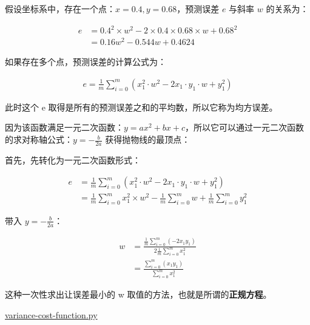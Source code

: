 \documentclass{ctexart}
\begin{document}
假设坐标系中，存在一个点：$x = 0.4, y = 0.68$，预测误差 $e$ 与斜率 $w$ 的关系为：

\[
	\begin{aligned}
		e & = 0.4^2 \times w^2 - 2 \times 0.4 \times 0.68 \times w + 0.68^2 \\
		  & = 0.16w^2 - 0.544w + 0.4624
	\end{aligned}
\]

\begin{center}
\end{center}

如果存在多个点，预测误差的计算公式为：

\[
	\begin{aligned}
		e = \frac{1}{m} \sum^{m}_{i = 0} (x_1^2 \cdot w^2 - 2x_1 \cdot y_1 \cdot w + y_1^2)
	\end{aligned}
\]

此时这个 e 取得是所有的预测误差之和的平均数，所以它称为均方误差。

因为该函数满足一元二次函数：$y = ax^2 + bx + c$，所以它可以通过一元二次函数的求对称轴公式：$y = -\frac{b}{2a}$ 获得抛物线的最顶点：

首先，先转化为一元二次函数形式：

\[
	\begin{aligned}
		e & = \frac{1}{m} \sum^{m}_{i = 0} (x_1^2 \cdot w^2 - 2x_1 \cdot y_1 \cdot w + y_1^2)                                     \\
		  & = \frac{1}{m} \sum^{m}_{i = 0} x_1^2 \times w^2 - \frac{1}{m} \sum^{m}_{i = 0} w + \frac{1}{m} \sum^{m}_{i = 0} y_1^2
	\end{aligned}
\]

带入 $y = -\frac{b}{2a}$：

\[
	\begin{aligned}
		w & = \frac {
			\frac{1}{m} \sum\limits^{m}_{i = 0} (-2x_1y_1)
		}{
			2\frac{1}{m} \sum\limits^{m}_{i = 0} x_1^2
		}             \\
		  & = \frac {
			\sum\limits^{m}_{i = 0} (x_1y_1)
		} {
			\sum\limits^{m}_{i = 0} x_1^2
		}
	\end{aligned}
\]

这种一次性求出让误差最小的 w 取值的方法，也就是所谓的\textbf{正规方程}。

\url{variance-cost-function.py}
\end{document}
